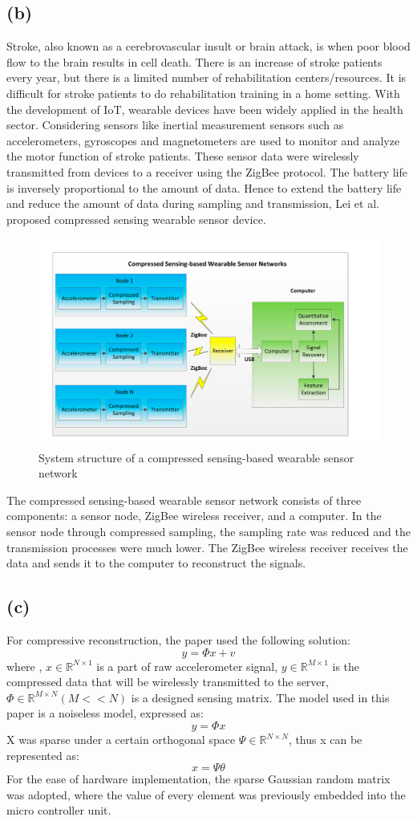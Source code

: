 \documentclass{article}
\begin{document}
\subsection{(b)}
Stroke, also known as a cerebrovascular insult or brain attack, is when poor blood flow to the brain results in cell death. There is an increase of stroke patients every year, but there is a limited number of rehabilitation centers/resources. It is difficult for stroke patients to do rehabilitation training in a home setting. With the development of IoT, wearable devices have been widely applied in the health sector. Considering sensors like inertial measurement sensors such as accelerometers, gyroscopes and magnetometers are used to monitor and analyze the motor function of stroke patients. These sensor data were wirelessly transmitted from devices to a receiver using the ZigBee protocol. The battery life is inversely proportional to the amount of data. Hence to extend the battery life and reduce the amount of data during sampling and transmission, Lei et al. proposed compressed sensing wearable sensor device.
\begin{figure}[ht]
\centering
\includegraphics[width=.8\textwidth]{papers/archietecture.png}
\caption{System structure of a compressed sensing-based wearable sensor network}
\end{figure}
The compressed sensing-based wearable sensor network consists of three components: a sensor node, ZigBee wireless receiver, and a computer.  In the sensor node through compressed sampling, the sampling rate was reduced and the transmission processes were much lower. The ZigBee wireless receiver receives the data and sends it to the computer to reconstruct the signals.

\subsection{(c)}
For compressive reconstruction, the paper used the following solution:
$$
    y = \Phi x + v
$$
where , $x \in \mathbb{R}^{N \times 1}$ is a part of raw accelerometer signal,  $y \in \mathbb{R}^{M \times 1}$ is the compressed data that will be wirelessly transmitted to the server, $ \Phi \in \mathbb{R}^{M \times N }(M << N)$ is a designed sensing matrix. The model used in this paper is a noiseless model, expressed as:
$$y = \Phi x$$
X was sparse under a certain orthogonal space $\Psi \in \mathbb{R} ^{N \times N}$, thus x can be represented as:
$$ x = \Psi \theta $$
For the ease of hardware implementation, the sparse Gaussian random matrix was adopted, where the value of every element was previously embedded into the micro controller unit.
\end{document}
